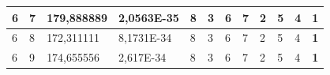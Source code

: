 \documentclass[conference]{IEEEtran}
\begin{document}
\begin{table}[]
\begin{tabular}{|llll|llllllll|}
\multicolumn{1}{|l|}{6}                                                     & \multicolumn{1}{l|}{7}                                                        & \multicolumn{1}{l|}{179,888889}                                                   & 2,0563E-35                     & \multicolumn{1}{l|}{8}                                                  & \multicolumn{1}{l|}{3}                                                  & \multicolumn{1}{l|}{6}                                                  & \multicolumn{1}{l|}{7}                                                  & \multicolumn{1}{l|}{2}                                                  & \multicolumn{1}{l|}{5}                                                  & \multicolumn{1}{l|}{4}                                                  & \textbf{1}                 \\ \hline
\multicolumn{1}{|l|}{6}                                                     & \multicolumn{1}{l|}{8}                                                        & \multicolumn{1}{l|}{172,311111}                                                   & 8,1731E-34                     & \multicolumn{1}{l|}{8}                                                  & \multicolumn{1}{l|}{3}                                                  & \multicolumn{1}{l|}{6}                                                  & \multicolumn{1}{l|}{7}                                                  & \multicolumn{1}{l|}{2}                                                  & \multicolumn{1}{l|}{5}                                                  & \multicolumn{1}{l|}{4}                                                  & \textbf{1}                 \\ \hline
\multicolumn{1}{|l|}{6}                                                     & \multicolumn{1}{l|}{9}                                                        & \multicolumn{1}{l|}{174,655556}                                                   & 2,617E-34                      & \multicolumn{1}{l|}{8}                                                  & \multicolumn{1}{l|}{3}                                                  & \multicolumn{1}{l|}{6}                                                  & \multicolumn{1}{l|}{7}                                                  & \multicolumn{1}{l|}{2}                                                  & \multicolumn{1}{l|}{5}                                                  & \multicolumn{1}{l|}{4}                                                  & \textbf{1}                 \\ \hline

\end{tabular}
\end{table}
\end{document}
